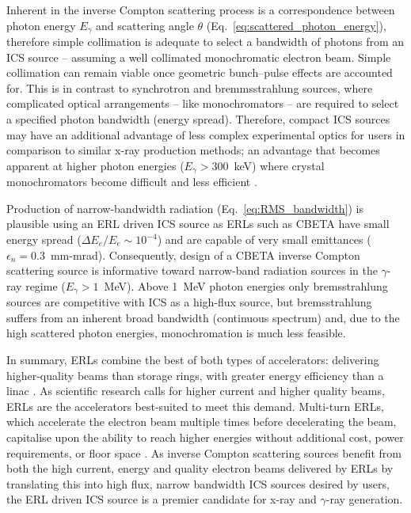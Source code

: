 \documentclass[../main.tex]{subfiles}
\begin{document}
Inherent in the inverse Compton scattering process is a correspondence between photon energy $E_{\gamma}$ and scattering angle $\theta$ (Eq.~\ref{eq:scattered_photon_energy}), therefore simple collimation is adequate to select a bandwidth of photons from an ICS source -- assuming a well collimated monochromatic electron beam. Simple collimation can remain viable once geometric bunch--pulse effects are accounted for. This is in contrast to synchrotron and bremmsstrahlung sources, where complicated optical arrangements -- like monochromators \cite{caciuffo1987monochromators} -- are required to select a specified photon bandwidth (energy spread). Therefore, compact ICS sources may have an additional advantage of less complex experimental optics for users in comparison to similar x-ray production methods; an advantage that becomes apparent at higher photon energies ($E_{\gamma}>300$~\si{\kilo\electronvolt}) where crystal monochromators become difficult and less efficient \cite{lienert1998focusing}. 
 
Production of narrow-bandwidth radiation (Eq.~\ref{eq:RMS_bandwidth}) is plausible using an ERL driven ICS source as ERLs such as CBETA have small energy spread ($\Delta E_{e}/E_{e}\sim 10^{-4}$) and are capable of very small emittances ($\epsilon_{n} = 0.3$~\si{\milli\meter}-\si{\milli\radian}). Consequently, design of a CBETA inverse Compton scattering source is informative toward narrow-band radiation sources in the $\gamma$-ray regime ($E_{\gamma} > 1$~\si{\mega\electronvolt}). Above 1~\si{\mega\electronvolt} photon energies only bremsstrahlung sources are competitive with ICS as a high-flux source, but bremsstrahlung suffers from an inherent broad bandwidth (continuous spectrum) and, due to the high scattered photon energies, monochromation is much less feasible.

In summary, ERLs combine the best of both types of accelerators: delivering higher-quality beams than storage rings, with greater energy efficiency than a linac \cite{smith2006optic}. As scientific research calls for higher current and higher quality beams, ERLs are the accelerators best-suited to meet this demand. Multi-turn ERLs, which accelerate the electron beam multiple times before decelerating the beam, capitalise upon the ability to reach higher energies without additional cost, power requirements, or floor space \cite{merminga2003high}. As inverse Compton scattering sources benefit from both the high current, energy and quality electron beams delivered by ERLs by translating this into high flux, narrow bandwidth ICS sources desired by users, the ERL driven ICS source is a premier candidate for x-ray and $\gamma$-ray generation. 
\end{document}
